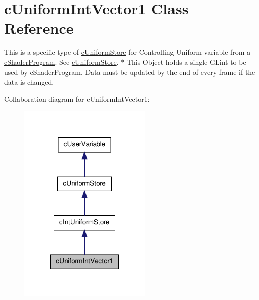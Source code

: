 \hypertarget{classc_uniform_int_vector1}{
\section{cUniformIntVector1 Class Reference}
\label{classc_uniform_int_vector1}
}


This is a specific type of \hyperlink{classc_uniform_store}{cUniformStore} for Controlling Uniform variable from a \hyperlink{classc_shader_program}{cShaderProgram}. See \hyperlink{classc_uniform_store}{cUniformStore}. $\ast$ This Object holds a single GLint to be used by \hyperlink{classc_shader_program}{cShaderProgram}. Data must be updated by the end of every frame if the data is changed.  




Collaboration diagram for cUniformIntVector1:\nopagebreak
\begin{figure}[H]
\begin{center}
\leavevmode
\includegraphics[width=180pt]{classc_uniform_int_vector1__coll__graph}
\end{center}
\end{figure}
